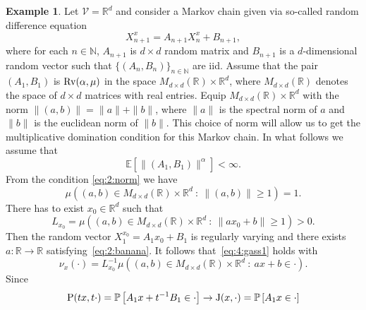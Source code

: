 \documentclass[preprint,12pt]{elsarticle}
\theoremstyle{definition}
\newtheorem{example}[thm]{Example}
\theoremstyle{remark}
\newcommand{\xbf}{{ x}}
\newcommand{\Xbf}{{ X}}
\newcommand{\1}{{\mathbf 1}}
\numberwithin{equation}{section}
\newcommand{\Prm}{{\rm P}}
\newcommand{\Krm}{{\rm J}}
\newcommand{\Rvrm}{{\rm Rv}}
\newcommand{\Vcal}{\mathcal{V}}
\begin{document}
  \begin{example}
    Let $\Vcal = \mathbb{R}^d$ and
    consider a Markov chain given via so-called random difference equation
    \begin{equation*}
      \Xbf_{n+1}^\xbf = A_{n+1} \Xbf_n^{\xbf} + B_{n+1},
    \end{equation*}
    where for each $n \in \mathbb{N}$, 
    $A_{n+1}$ is $d \times d$ random matrix and $B_{n+1}$ is a 
    $d$-dimensional random vector such that $\{ (A_n, B_n)\}_{n \in \mathbb{N}}$
    are iid. Assume that the pair $(A_1,B_1)$ is $\Rvrm(\alpha, \mu)$ 
    in the space 
    $M_{d\times d}(\mathbb{R}) \times \mathbb{R}^d$, 
    where $M_{d\times d}(\mathbb{R})$ denotes
    the space of $d\times d$ matrices with real entries. 
    Equip $M_{d\times d}(\mathbb{R}) \times \mathbb{R}^d$ with the norm
    $\|(a,b)\|=\|a\| + \|b\|$, where $\|a\|$ is the spectral norm of $a$ and
    $\|b\|$ is the euclidean norm of $\|b\|$. This choice of norm will allow us to get the multiplicative domination condition for this Markov chain.
    In what follows we assume that
    \begin{equation*}
        \mathbb{E}[\|(A_1,B_1)\|^\alpha]<\infty.
    \end{equation*}
    From the condition \eqref{eq:2:norm} we have
    \begin{equation*}
      \mu \left( (a,b) \in M_{d \times d}(\mathbb{R}) \times \mathbb{R}^d \: : 
      \: \|(a,b)\|\geq 1\right)=1.
    \end{equation*}
    There has to exist $x_0 \in \mathbb{R}^d$ such that
    \begin{equation*}
      L_{x_0}=\mu \left( (a,b) \in M_{d \times d}(\mathbb{R}) \times \mathbb{R}^d \: : 
      \: \|ax_0+b\|\geq 1\right)>0.
    \end{equation*}
    Then the random vector $X_1^{x_0}=A_1x_0+B_1$ is regularly varying 
    and there exists $a \colon \mathbb{R} \to \mathbb{R}$ satisfying~\eqref{eq:2:banana}. 
    It follows that~\eqref{eq:4:gass1} holds with
    \begin{equation*}
      \nu_x(\cdot) = L_{x_0}^{-1} 
      \mu \left( (a,b) \in M_{d \times d}(\mathbb{R}) \times \mathbb{R}^d \: : 
      \: ax+b \in \cdot\right).
    \end{equation*}
    Since 
    \begin{equation*}
      \Prm(tx, t \cdot) = \mathbb{P} \left[ A_1x + t^{-1}B_1 \in \cdot  \right]
      \to \Krm(x, \cdot) = \mathbb{P} \left[ A_1x \in \cdot  \right]
    \end{equation*}

\end{example}
\end{document}
